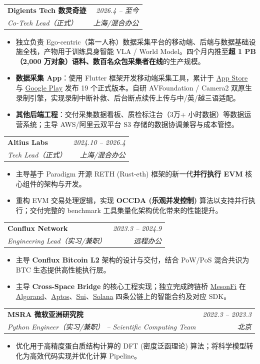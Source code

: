 \documentclass[letterpaper,11pt]{article}
\makeatletter
\newcommand{\resumeItemWithoutColon}[1]{
  \item\small{
    {#1 \vspace{-2pt}}
  }
}
\newcommand{\resumeSubheading}[4]{
  \vspace{0pt}\item
    \begin{tabular*}{0.97\textwidth}[t]{l@{\extracolsep{\fill}}r}
      \textbf{#1} & \textit{\small#2} \\
      \textit{\small#3} & \textit{\small #4} \\
    \end{tabular*}\vspace{-5pt}
}
\newcommand{\resumeItemListStart}{\begin{itemize}[leftmargin=*]}
\newcommand{\resumeItemListEnd}{\end{itemize}\vspace{-5pt}}
\makeatother
\begin{document}
    \resumeSubheading
      {Digients Tech 数灵奇迹}{2026.4 -- 至今}
      {Co-Tech Lead（正式）}{上海/混合办公}
      \resumeItemListStart
        \resumeItemWithoutColon{独立负责 Ego-centric（第一人称）数据采集平台的移动端、后端与数据基础设施全栈，产物用于训练具身智能 VLA / World Model。四个月内推至\textbf{超 1 PB（2,000 万对象）语料、数百名众包采集者在线}的生产规模。}
        \resumeItemWithoutColon{\textbf{数据采集 App}：使用 Flutter 框架开发移动端采集工具，累计于 \href{https://apps.apple.com/app/id6767919120}{App Store} 与 \href{https://play.google.com/store/apps/details?id=tech.digients.capture}{Google Play} 发布 19 个正式版本。自研 AVFoundation / Camera2 双原生录制引擎，实现录制中断补救、后台断点续传上传与中/英/越三语适配。}
        \resumeItemWithoutColon{\textbf{其他后端工程}：交付采集数据看板、质检标注台（3万+ 小时数据）等数据运营系统；主导 AWS/阿里云双平台 S3 存储的数据协调兼容与成本管控。}
      \resumeItemListEnd

    \resumeSubheading
      {Altius Labs}{2024.10 -- 2026.4}
      {Tech Lead（正式）}{上海/混合办公}
      \resumeItemListStart
        \resumeItemWithoutColon{主导基于 Paradigm 开源 RETH (Rust-eth) 框架的新一代\textbf{并行执行 EVM} 核心组件的架构与开发。}
        \resumeItemWithoutColon{重构 EVM 交易处理逻辑，实现 \textbf{OCCDA (乐观并发控制)} 算法以支持并行执行；交付完整的 benchmark 工具集量化架构优化带来的性能提升。}
      \resumeItemListEnd

    \resumeSubheading
      {Conflux Network}{2023.3 -- 2024.9}
      {Engineering Lead（实习/兼职）}{远程办公}
      \resumeItemListStart
        \resumeItemWithoutColon{主导 \textbf{Conflux Bitcoin L2} 架构的设计与交付，结合 PoW/PoS 混合共识为 BTC 生态提供高性能执行层。}
        \resumeItemWithoutColon{主导 \textbf{Cross-Space Bridge} 的核心工程实现；独立完成跨链桥 \href{https://meson.fi/zh}{MesonFi} 在 \href{https://github.com/wyf-ACCEPT/meson-contract-algorand}{Algorand}、\href{https://github.com/MesonFi/meson-contracts-aptos}{Aptos}、\href{https://github.com/wyf-ACCEPT/meson-contracts-sui}{Sui}、\href{https://github.com/wyf-ACCEPT/meson-contracts-solana}{Solana} 四条公链上的智能合约及对应 SDK。}
      \resumeItemListEnd

    \resumeSubheading
      {MSRA 微软亚洲研究院}{2022.3 -- 2023.3}
      {Python Engineer（实习/兼职） -- Scientific Computing Team}{北京}
      \resumeItemListStart
        \resumeItemWithoutColon{优化用于高精度蛋白质结构计算的 DFT (密度泛函理论) 算法；将科学模型转化为高效代码实现并优化计算 Pipeline。}
      \resumeItemListEnd
\end{document}
